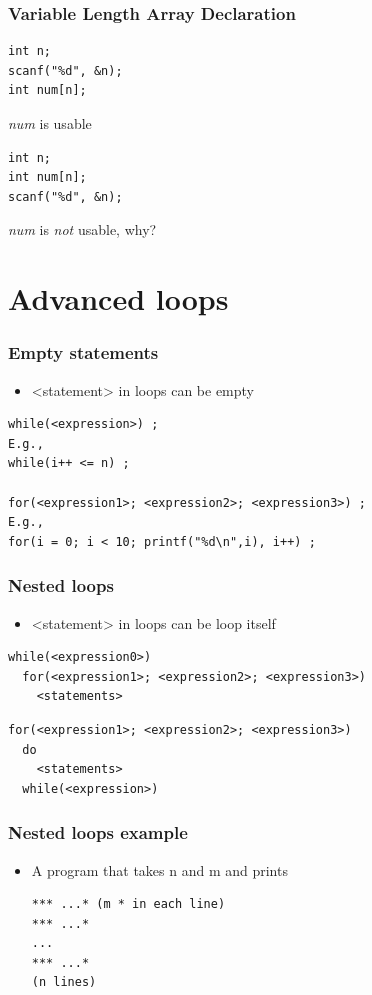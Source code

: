 \documentclass{../c-lecture}
\begin{document}
\begin{frame}[fragile]
  \frametitle{Variable Length Array Declaration}
  \begin{verbatim}
int n;
scanf("%d", &n);
int num[n];
  \end{verbatim}
  \textit{\color{Orange} num} is usable
  \begin{verbatim}
int n;
int num[n];
scanf("%d", &n);
  \end{verbatim}
  \begin{block}{}
    \textit{\color{Orange} num} is
    \textit{\color{RubineRed} not} usable, why?
  \end{block}
\end{frame}

\section{Advanced loops}

\begin{frame}[fragile]
  \frametitle{Empty statements}
  \begin{itemize}
    \item <statement> in loops can be empty
  \end{itemize}
  \begin{verbatim}
while(<expression>) ;
E.g.,
while(i++ <= n) ;

for(<expression1>; <expression2>; <expression3>) ;
E.g.,
for(i = 0; i < 10; printf("%d\n",i), i++) ;
  \end{verbatim}
\end{frame}

\begin{frame}[fragile]
  \frametitle{Nested loops}
  \begin{itemize}
    \item <statement> in loops can be loop itself
  \end{itemize}
  \begin{verbatim}
while(<expression0>)
  for(<expression1>; <expression2>; <expression3>)
    <statements>
  \end{verbatim}
  \begin{verbatim}
for(<expression1>; <expression2>; <expression3>)
  do
    <statements>
  while(<expression>)
  \end{verbatim}
\end{frame}

\begin{frame}[fragile]
  \frametitle{Nested loops example}
  \begin{itemize}
    \item A program that takes n and m and prints
    \begin{verbatim}
*** ...* (m * in each line)
*** ...*
...
*** ...*
(n lines)
    \end{verbatim}
  \end{itemize}
\end{frame}
\end{document}
